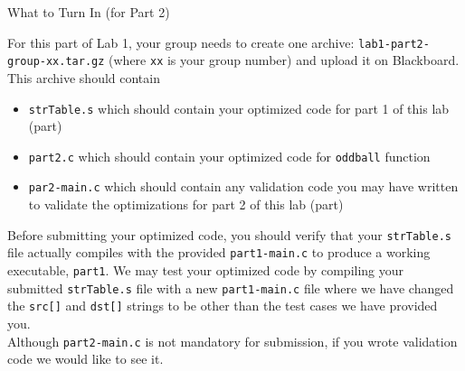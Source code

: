 \documentclass{article}
\newcommand{\asm}[1]{\texttt{#1}}
\begin{document}
\begin{section}{What to Turn In (for Part 2)}

		\noindent
		For this part of Lab 1, your group needs to create one archive: \texttt{lab1-part2-group-xx.tar.gz} (where \asm{xx} is your group number) and upload it on Blackboard.
        This archive should contain
        \begin{itemize}
		\item \texttt{strTable.s} which should contain your optimized code for part 1 of this lab (part)
        \item \texttt{part2.c} which should contain your optimized code for \asm{oddball} function \omitit{and \asm{randGenerator}}
        \item \texttt{par2-main.c} which should contain any validation code you may have written to validate the optimizations for part 2 of this lab (part)
        \end{itemize}

		\noindent
		Before submitting your optimized code, you should
		verify that your \texttt{strTable.s} file
		actually compiles with the provided
		\texttt{part1-main.c} to produce a working executable,
		\texttt{part1}. We may test your optimized code by compiling your
		submitted \texttt{strTable.s} file with a
		new \texttt{part1-main.c} file where we have changed
		the \texttt{src[]} and \texttt{dst[]} strings to be
		other than the test cases we have provided you. \\ \newline
        \noindent
        Although \asm{part2-main.c} is not mandatory for submission, if you wrote validation code we would like to see it.
\end{section}

	
	
\end{document}
